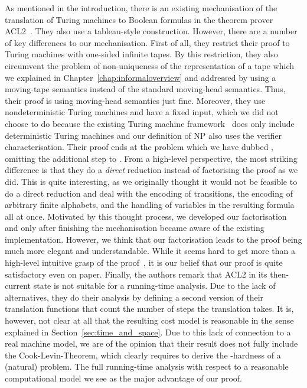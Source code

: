 As mentioned in the introduction, there is an existing mechanisation of the translation of Turing machines to Boolean formulas in the theorem prover ACL2~\cite{gamboa:cook}. They also use a tableau-style construction. However, there are a number of key differences to our mechanisation.
First of all, they restrict their proof to Turing machines with one-sided infinite tapes. By this restriction, they also circumvent the problem of non-uniqueness of the representation of a tape which we explained in Chapter~\ref{chap:informaloverview} and addressed by using a moving-tape semantics instead of the standard moving-head semantics. Thus, their proof is using moving-head semantics just fine.
Moreover, they use nondeterministic Turing machines and have a fixed input, which we did not choose to do because the existing Turing machine framework~\cite{ForsterEtAl:2019:VerifiedTMs} does only include deterministic Turing machines and our definition of NP also uses the verifier characterisation. Their proof ends at the problem which we have dubbed \fsat{}, omitting the additional step to \sat{}.
From a high-level perspective, the most striking difference is that they do a \emph{direct} reduction instead of factorising the proof as we did. This is quite interesting, as we originally thought it would not be feasible to do a direct reduction and deal with the encoding of transitions, the encoding of arbitrary finite alphabets, and the handling of variables in the resulting formula all at once. Motivated by this thought process, we developed our factorisation and only after finishing the mechanisation became aware of the existing implementation.
However, we think that our factorisation leads to the proof being much more elegant and understandable. While it seems hard to get more than a high-level intuitive grasp of the proof~\cite{gamboa:cook}, it is our belief that our proof is quite satisfactory even on paper.
Finally, the authors remark that ACL2 in its then-current state is not suitable for a running-time analysis. Due to the lack of alternatives, they do their analysis by defining a second version of their translation functions that count the number of steps the translation takes. It is, however, not clear at all that the resulting cost model is reasonable in the sense explained in Section~\ref{sec:time_and_space}.
Due to this lack of connection to a real machine model, we are of the opinion that their result does not fully include the Cook-Levin-Theorem, which clearly requires to derive the \NP{}-hardness of a (natural) problem.
The full running-time analysis with respect to a reasonable computational model we see as the major advantage of our proof.


